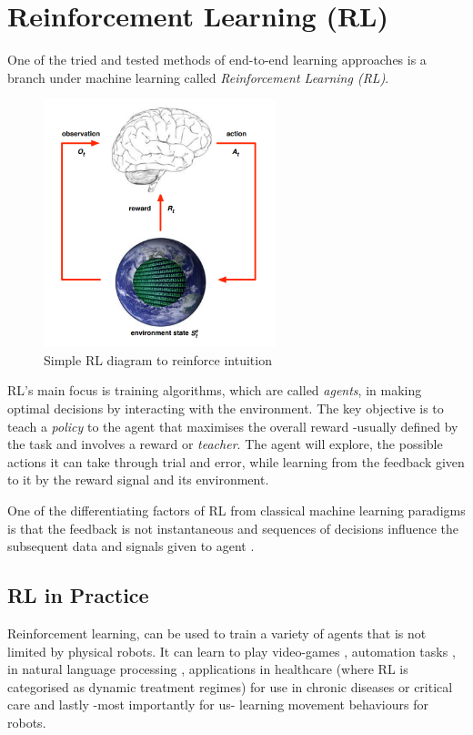 \section{Reinforcement Learning (RL)}\label{sec:rl}
  One of the tried and tested methods of end-to-end learning approaches is a branch under machine learning called \emph{Reinforcement Learning (RL)}. 

  \begin{figure}[h]
    \centering
    \includegraphics[width=0.6\textwidth]{assets/background/silver-rl.png}
    \caption{Simple RL diagram to reinforce intuition \cite{silver2015}}\label{fig:rl-diag}
  \end{figure}

  RL's main focus is training algorithms, which are called \emph{agents}, in making optimal decisions by interacting with the environment. The key objective is to teach a \emph{policy} to the agent that maximises the overall reward -usually defined by the task and involves a reward or \emph{teacher}. The agent will explore, the possible actions it can take through trial and error, while learning from the feedback given to it by the reward signal and its environment.

  One of the differentiating factors of RL from classical machine learning paradigms is that the feedback is not instantaneous and sequences of decisions influence the subsequent data and signals given to agent \cite{silver2015}.

\subsection{RL in Practice}
  Reinforcement learning, can be used to train a variety of agents that is not limited by physical robots. It can learn to play video-games \cite{comi2018}, automation tasks \cite{} , in natural language processing \cite{paulus2017deepreinforcedmodelabstractive}, applications in healthcare (where RL is categorised as dynamic treatment regimes) for use in chronic diseases or critical care \cite{yu2020reinforcementlearninghealthcaresurvey} and lastly -most importantly for us- learning movement behaviours for robots.


